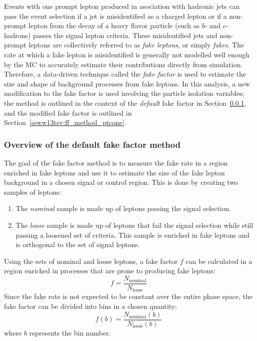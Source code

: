 Events with one prompt lepton produced in asociation with hadronic jets can pass the event selection if a jet is misidentified as a charged lepton or if a non-prompt lepton from the decay of a heavy flavor particle (such as $b$- and $c$-hadrons) passes the signal lepton criteria.
These misidentified jets and non-prompt leptons are collectively referred to as \emph{fake leptons}, or simply \emph{fakes}.
The rate at which a fake lepton is misidentified is generally not modelled well enough by the MC to accurately estimate their contributions directly from simulation.
Therefore, a data-driven technique called the \emph{fake factor} is used to estimate the size and shape of background processes from fake leptons.
In this analysis, a new modification to the fake factor is used involving the particle isolation variables; the method is outlined in the context of the \emph{default} fake factor in Section~\ref{ssww13tev:ff_method_default}, and the modified fake factor is outlined in Section~\ref{ssww13tev:ff_method_ptcone}.

%
\subsubsection{Overview of the default fake factor method}\label{ssww13tev:ff_method_default}
The goal of the fake factor method is to measure the fake rate in a region enriched in fake leptons and use it to estimate the size of the fake lepton background in a chosen signal or control region.
This is done by creating two samples of leptons: 
\begin{enumerate}
\item The \emph{nominal} sample is made up of leptons passing the signal selection.
\item The \emph{loose} sample is made up of leptons that fail the signal selection while still passing a loosened set of criteria.  This sample is enriched in fake leptons and is orthogonal to the set of signal leptons.
\end{enumerate}
Using the sets of nominal and loose leptons, a fake factor $f$ can be calculated in a region enriched in processes that are prone to producing fake leptons:
\begin{equation}
f = \frac{N_{\textrm{nominal}}}{N_{\textrm{loose}}}
\label{eq:ssww13tev_ff_default_unbinned}
\end{equation}
Since the fake rate is not expected to be constant over the entire phase space, the fake factor can be divided into bins in a chosen quantity:
\begin{equation}
f(b) = \frac{N_{\textrm{nominal}}(b)}{N_{\textrm{loose}}(b)}
\label{eq:ssww13tev_ff_default_binned}
\end{equation}
where $b$ represents the bin number.

